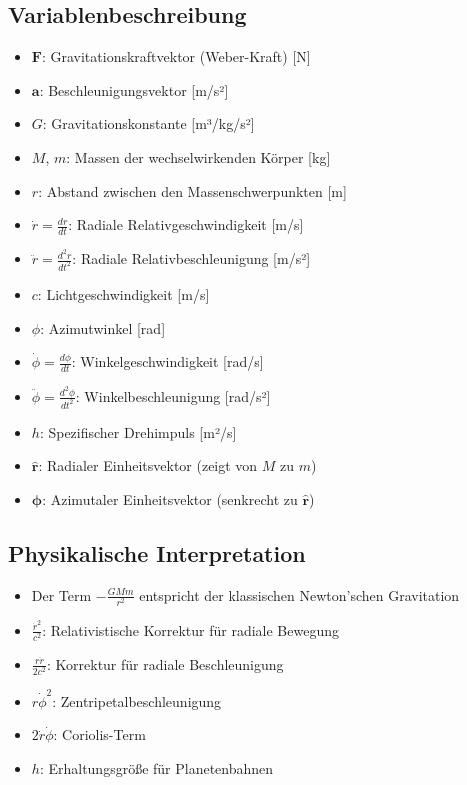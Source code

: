 \subsection*{Variablenbeschreibung}
\begin{itemize}[leftmargin=*,noitemsep]
    \item $\mathbf{F}$: Gravitationskraftvektor (Weber-Kraft) [N]
    \item $\mathbf{a}$: Beschleunigungsvektor [m/s²]
    \item $G$: Gravitationskonstante [m³/kg/s²]
    \item $M$, $m$: Massen der wechselwirkenden Körper [kg]
    \item $r$: Abstand zwischen den Massenschwerpunkten [m]
    \item $\dot{r} = \frac{dr}{dt}$: Radiale Relativgeschwindigkeit [m/s]
    \item $\ddot{r} = \frac{d^2r}{dt^2}$: Radiale Relativbeschleunigung [m/s²]
    \item $c$: Lichtgeschwindigkeit [m/s]
    \item $\phi$: Azimutwinkel [rad]
    \item $\dot{\phi} = \frac{d\phi}{dt}$: Winkelgeschwindigkeit [rad/s]
    \item $\ddot{\phi} = \frac{d^2\phi}{dt^2}$: Winkelbeschleunigung [rad/s²]
    \item $h$: Spezifischer Drehimpuls [m²/s]
    \item $\mathbf{\hat{r}}$: Radialer Einheitsvektor (zeigt von $M$ zu $m$)
    \item $\mathbf{\hat{\phi}}$: Azimutaler Einheitsvektor (senkrecht zu $\mathbf{\hat{r}}$)
\end{itemize}

\subsection*{Physikalische Interpretation}
\begin{itemize}[leftmargin=*,noitemsep]
    \item Der Term $-\frac{GMm}{r^2}$ entspricht der klassischen Newton'schen Gravitation
    \item $\frac{\dot{r}^2}{c^2}$: Relativistische Korrektur für radiale Bewegung
    \item $\frac{r\ddot{r}}{2c^2}$: Korrektur für radiale Beschleunigung
    \item $r\dot{\phi}^2$: Zentripetalbeschleunigung
    \item $2\dot{r}\dot{\phi}$: Coriolis-Term
    \item $h$: Erhaltungsgröße für Planetenbahnen
\end{itemize}
